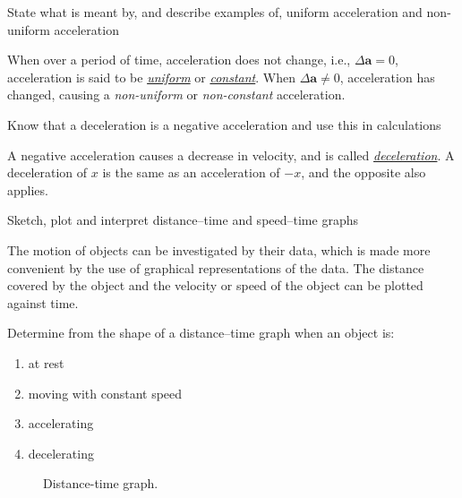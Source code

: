 \begin{point}
State what is meant by, and describe examples of, uniform acceleration and non-uniform acceleration
\end{point}

When over a period of time, acceleration does not change, i.e., $\Delta \bm{a} = 0$, acceleration
is said to be \ul{\textit{uniform}} or \underline{\textit{constant}}. 
When $\Delta \bm{a} \ne 0$, acceleration
has changed, causing a \textit{non-uniform} or \textit{non-constant} acceleration.

\begin{point}
Know that a deceleration is a negative acceleration and use this in calculations
\end{point}

A negative acceleration causes a decrease in velocity, and is called \ul{\emph{deceleration}}. A deceleration
of $x$ is the same as an acceleration of $-x$, and the opposite also applies.

\begin{point}
Sketch, plot and interpret distance–time and speed–time graphs
\end{point}

The motion of objects can be investigated by their data, which is made more convenient by the use 
of graphical representations of the data. The distance covered by the object and the velocity or
speed of the object can be plotted against time.

\begin{point}
Determine from the shape of a distance–time graph when an object is:

\begin{enumerate}[label=(\alph*)]
\setlength\itemsep{0em}
\item at rest
\item moving with constant speed
\item accelerating
\item decelerating
\end{enumerate}
\end{point}

\begin{figure}
	\centering

	\caption{Distance-time graph.}
\end{figure}

